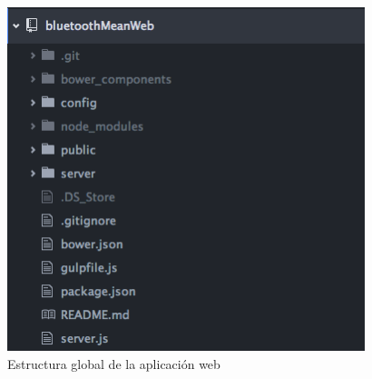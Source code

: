 \begin{figure}[h] \centering
	\includegraphics[height=10cm]{graphs/webEstructuraGlobal.png} \caption{Estructura global de la aplicación web}\label{fig:webEstructuraGlobal}
\end{figure}

